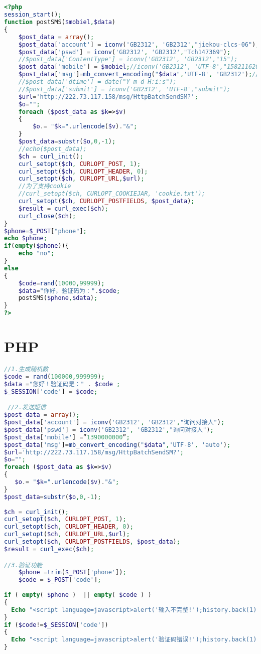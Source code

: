 \documentclass[11pt]{book} %
\begin{document}
\begin{lstlisting}[language=PHP]


<?php
session_start();
function postSMS($mobiel,$data)
{
	$post_data = array();
	$post_data['account'] = iconv('GB2312', 'GB2312',"jiekou-clcs-06");
	$post_data['pswd'] = iconv('GB2312', 'GB2312',"Tch147369");
	//$post_data['ContentType'] = iconv('GB2312', 'GB2312',"15");
	$post_data['mobile'] = $mobiel;//iconv('GB2312', 'UTF-8',"15821162098");
	$post_data['msg']=mb_convert_encoding("$data",'UTF-8', 'GB2312');//iconv('GB2312', 'UTF-8',"123456");
	//$post_data['dtime'] = date("Y-m-d H:i:s");
	//$post_data['submit'] = iconv('GB2312', 'UTF-8',"submit");
	$url='http://222.73.117.158/msg/HttpBatchSendSM?';
	$o="";
	foreach ($post_data as $k=>$v)
	{
		$o.= "$k=".urlencode($v)."&";
	}
	$post_data=substr($o,0,-1);
	//echo($post_data);
	$ch = curl_init();
	curl_setopt($ch, CURLOPT_POST, 1);
	curl_setopt($ch, CURLOPT_HEADER, 0);
	curl_setopt($ch, CURLOPT_URL,$url);
	//为了支持cookie
	//curl_setopt($ch, CURLOPT_COOKIEJAR, 'cookie.txt');
	curl_setopt($ch, CURLOPT_POSTFIELDS, $post_data);
	$result = curl_exec($ch);
	curl_close($ch);
}
$phone=$_POST["phone"];
echo $phone;
if(empty($phone)){
	echo "no";
}
else 
{
	$code=rand(10000,99999);
	$data="你好，验证码为：".$code;
	postSMS($phone,$data);
}
?>
\end{lstlisting}


\section{PHP}

\begin{lstlisting}[language=PHP]
//1.生成随机数
$code = rand(100000,999999);
$data ="您好！验证码是：" . $code ;
$_SESSION['code'] = $code;

 //2.发送短信
$post_data = array();
$post_data['account'] = iconv('GB2312', 'GB2312',"询问对接人");
$post_data['pswd'] = iconv('GB2312', 'GB2312',"询问对接人");
$post_data['mobile'] =”1390000000”;
$post_data['msg']=mb_convert_encoding("$data",'UTF-8', 'auto');
$url='http://222.73.117.158/msg/HttpBatchSendSM?'; 
$o="";
foreach ($post_data as $k=>$v)
{
   $o.= "$k=".urlencode($v)."&";
}
$post_data=substr($o,0,-1);
 
$ch = curl_init();
curl_setopt($ch, CURLOPT_POST, 1);
curl_setopt($ch, CURLOPT_HEADER, 0);
curl_setopt($ch, CURLOPT_URL,$url);
curl_setopt($ch, CURLOPT_POSTFIELDS, $post_data);
$result = curl_exec($ch);

//3.验证功能
 	$phone =trim($_POST['phone']);
	$code = $_POST['code'];
 
if ( empty( $phone )  || empty( $code ) )
{
  Echo "<script language=javascript>alert('输入不完整!');history.back(1);</script>" ;
}
if ($code!=$_SESSION['code'])
{
  Echo "<script language=javascript>alert('验证码错误!');history.back(1);</script>" ;
}
\end{lstlisting}
\end{document}
